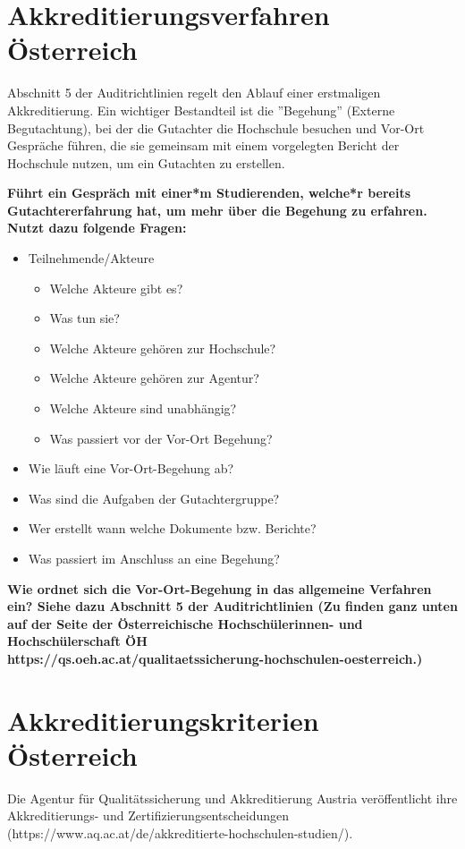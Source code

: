 \documentclass{scrartcl}
\begin{document}
\newpage
\section*{Akkreditierungsverfahren Österreich}
Abschnitt 5 der Auditrichtlinien regelt den Ablauf einer erstmaligen Akkreditierung. Ein wichtiger Bestandteil ist die ''Begehung'' (Externe Begutachtung), bei der die Gutachter die Hochschule besuchen und Vor-Ort Gespräche führen, die sie gemeinsam mit einem vorgelegten Bericht der Hochschule nutzen, um ein Gutachten zu erstellen.

\vspace{0.5cm}

\textbf{Führt ein Gespräch mit einer*m Studierenden, welche*r bereits Gutachtererfahrung hat, um mehr über die Begehung zu erfahren. Nutzt dazu folgende Fragen: }

\begin{itemize}
\item Teilnehmende/Akteure
	\begin{itemize}
		\item Welche Akteure gibt es?
		\item Was tun sie?
		\item Welche Akteure gehören zur Hochschule?
		\item Welche Akteure gehören zur Agentur?
		\item Welche Akteure sind unabhängig?
		\item Was passiert vor der Vor-Ort Begehung?
	\end{itemize}
\item Wie läuft eine Vor-Ort-Begehung ab?
\item Was sind die Aufgaben der Gutachtergruppe?
\item Wer erstellt wann welche Dokumente bzw. Berichte?
\item Was passiert im Anschluss an eine Begehung?
\end{itemize}

\textbf{Wie ordnet sich die Vor-Ort-Begehung in das allgemeine Verfahren ein? Siehe dazu Abschnitt 5 der Auditrichtlinien (Zu finden ganz unten auf der Seite der Österreichische Hochschülerinnen- und Hochschülerschaft ÖH\\
https://qs.oeh.ac.at/qualitaetssicherung-hochschulen-oesterreich.)}

\newpage
\section*{Akkreditierungskriterien Österreich}
Die Agentur für Qualitätssicherung und Akkreditierung Austria veröffentlicht ihre Akkreditierungs- und Zertifizierungsentscheidungen (https://www.aq.ac.at/de/akkreditierte-hochschulen-studien/).
\end{document}
